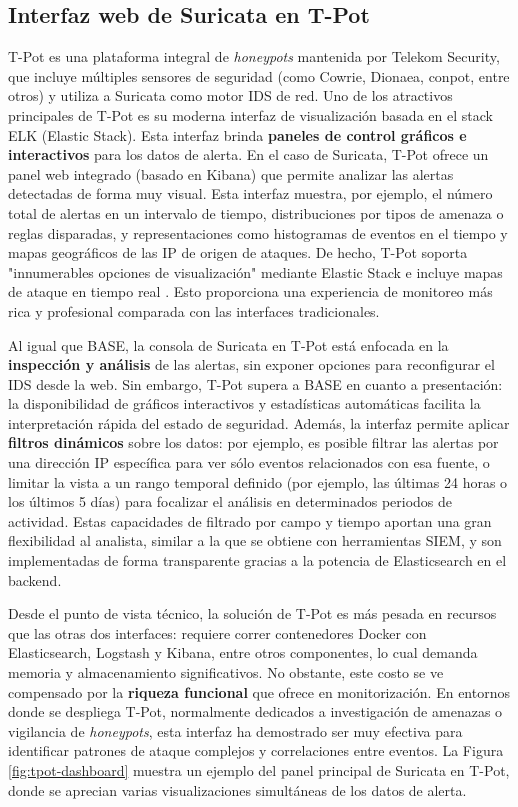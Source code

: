 \documentclass[11pt,a4paper,twoside]{report}
\begin{document}
\subsection{Interfaz web de Suricata en T-Pot}
T-Pot es una plataforma integral de \emph{honeypots} mantenida por Telekom Security, que incluye múltiples sensores de seguridad (como Cowrie, Dionaea, conpot, entre otros) y utiliza a Suricata como motor IDS de red. Uno de los atractivos principales de T-Pot es su moderna interfaz de visualización basada en el stack ELK (Elastic Stack). Esta interfaz brinda \textbf{paneles de control gráficos e interactivos} para los datos de alerta. En el caso de Suricata, T-Pot ofrece un panel web integrado (basado en Kibana) que permite analizar las alertas detectadas de forma muy visual. Esta interfaz muestra, por ejemplo, el número total de alertas en un intervalo de tiempo, distribuciones por tipos de amenaza o reglas disparadas, y representaciones como histogramas de eventos en el tiempo y mapas geográficos de las IP de origen de ataques. De hecho, T-Pot soporta "innumerables opciones de visualización" mediante Elastic Stack e incluye mapas de ataque en tiempo real \cite{tpot}. Esto proporciona una experiencia de monitoreo más rica y profesional comparada con las interfaces tradicionales.\newline

Al igual que BASE, la consola de Suricata en T-Pot está enfocada en la \textbf{inspección y análisis} de las alertas, sin exponer opciones para reconfigurar el IDS desde la web. Sin embargo, T-Pot supera a BASE en cuanto a presentación: la disponibilidad de gráficos interactivos y estadísticas automáticas facilita la interpretación rápida del estado de seguridad. Además, la interfaz permite aplicar \textbf{filtros dinámicos} sobre los datos: por ejemplo, es posible filtrar las alertas por una dirección IP específica para ver sólo eventos relacionados con esa fuente, o limitar la vista a un rango temporal definido (por ejemplo, las últimas 24 horas o los últimos 5 días) para focalizar el análisis en determinados periodos de actividad. Estas capacidades de filtrado por campo y tiempo aportan una gran flexibilidad al analista, similar a la que se obtiene con herramientas SIEM, y son implementadas de forma transparente gracias a la potencia de Elasticsearch en el backend.\newline

Desde el punto de vista técnico, la solución de T-Pot es más pesada en recursos que las otras dos interfaces: requiere correr contenedores Docker con Elasticsearch, Logstash y Kibana, entre otros componentes, lo cual demanda memoria y almacenamiento significativos. No obstante, este costo se ve compensado por la \textbf{riqueza funcional} que ofrece en monitorización. En entornos donde se despliega T-Pot, normalmente dedicados a investigación de amenazas o vigilancia de \emph{honeypots}, esta interfaz ha demostrado ser muy efectiva para identificar patrones de ataque complejos y correlaciones entre eventos. La Figura \ref{fig:tpot-dashboard} muestra un ejemplo del panel principal de Suricata en T-Pot, donde se aprecian varias visualizaciones simultáneas de los datos de alerta.\newline
\end{document}
